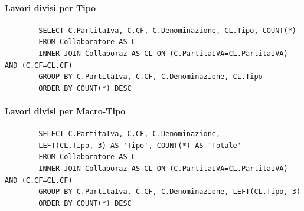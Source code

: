 \documentclass{elegantbook}
\begin{document}
\paragraph{Lavori divisi per Tipo}
	\begin{verbatim}
		SELECT C.PartitaIva, C.CF, C.Denominazione, CL.Tipo, COUNT(*)
		FROM Collaboratore AS C 
		INNER JOIN Collaboraz AS CL ON (C.PartitaIVA=CL.PartitaIVA) AND (C.CF=CL.CF)
		GROUP BY C.PartitaIva, C.CF, C.Denominazione, CL.Tipo
		ORDER BY COUNT(*) DESC
	\end{verbatim}
\begin{figure}[H]
	\centering
\end{figure}
\paragraph{Lavori divisi per Macro-Tipo}
	\begin{verbatim}
		SELECT C.PartitaIva, C.CF, C.Denominazione, 
		LEFT(CL.Tipo, 3) AS 'Tipo', COUNT(*) AS 'Totale'
		FROM Collaboratore AS C 
		INNER JOIN Collaboraz AS CL ON (C.PartitaIVA=CL.PartitaIVA) AND (C.CF=CL.CF)
		GROUP BY C.PartitaIva, C.CF, C.Denominazione, LEFT(CL.Tipo, 3)
		ORDER BY COUNT(*) DESC
	\end{verbatim}
\end{document}
